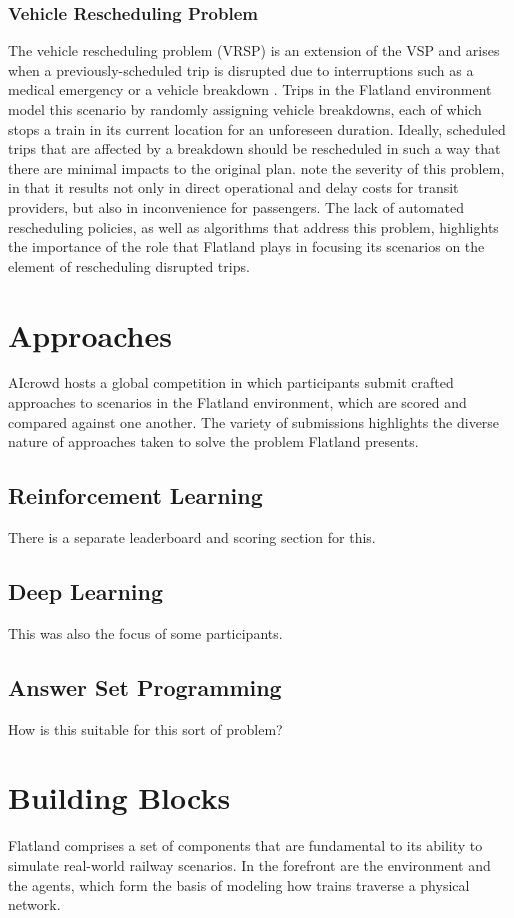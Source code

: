 \documentclass[11pt]{article}
\begin{document}
\subsubsection{Vehicle Rescheduling Problem}
The vehicle rescheduling problem (VRSP) is an extension of the VSP and arises when a previously-scheduled trip is disrupted due to interruptions such as a medical emergency or a vehicle breakdown \cite{limibo07a}.  Trips in the Flatland environment model this scenario by randomly assigning vehicle breakdowns, each of which stops a train in its current location for an unforeseen duration.  Ideally, scheduled trips that are affected by a breakdown should be rescheduled in such a way that there are minimal impacts to the original plan.  \cite{limibo07a} note the severity of this problem, in that it results not only in direct operational and delay costs for transit providers, but also in inconvenience for passengers.  The lack of automated rescheduling policies, as well as algorithms that address this problem, highlights the importance of the role that Flatland plays in focusing its scenarios on the element of rescheduling disrupted trips.


\section{Approaches}
AIcrowd hosts a global competition in which participants submit crafted approaches to scenarios in the Flatland environment, which are scored and compared against one another.  The variety of submissions highlights the diverse nature of approaches taken to solve the problem Flatland presents.
\subsection{Reinforcement Learning}
There is a separate leaderboard and scoring section for this.

\subsection{Deep Learning}
This was also the focus of some participants.

\subsection{Answer Set Programming}
How is this suitable for this sort of problem?


\section{Building Blocks}
Flatland comprises a set of components that are fundamental to its ability to simulate real-world railway scenarios.  In the forefront are the environment and the agents, which form the basis of modeling how trains traverse a physical network.
\end{document}
